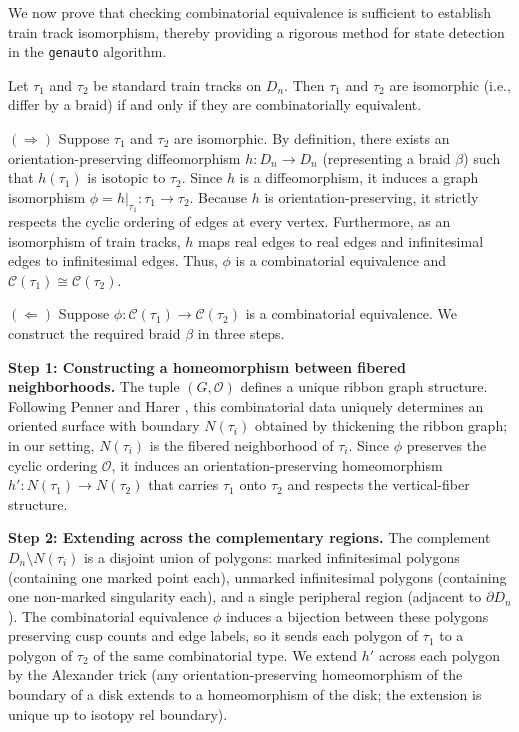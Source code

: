 We now prove that checking combinatorial equivalence is sufficient to establish train track isomorphism, thereby providing a rigorous method for state detection in the \texttt{genauto} algorithm.

\begin{prop}
    \label{prop:comb_iso}
    Let $\tau_1$ and $\tau_2$ be standard train tracks on $D_n$. Then $\tau_1$ and $\tau_2$ are isomorphic (i.e., differ by a braid) if and only if they are combinatorially equivalent.
\end{prop}

\begin{myproof}
    $(\Rightarrow)$ Suppose $\tau_1$ and $\tau_2$ are isomorphic. By definition, there exists an orientation-preserving diffeomorphism $h: D_n \to D_n$ (representing a braid $\beta$) such that $h(\tau_1)$ is isotopic to $\tau_2$. Since $h$ is a diffeomorphism, it induces a graph isomorphism $\phi = h|_{\tau_1}: \tau_1 \to \tau_2$. Because $h$ is orientation-preserving, it strictly respects the cyclic ordering of edges at every vertex. Furthermore, as an isomorphism of train tracks, $h$ maps real edges to real edges and infinitesimal edges to infinitesimal edges. Thus, $\phi$ is a combinatorial equivalence and $\mathcal{C}(\tau_1) \cong \mathcal{C}(\tau_2)$.

    $(\Leftarrow)$ Suppose $\phi: \mathcal{C}(\tau_1) \to \mathcal{C}(\tau_2)$ is a combinatorial equivalence. We construct the required braid $\beta$ in three steps.

    \textbf{Step 1: Constructing a homeomorphism between fibered neighborhoods.}
    The tuple $(G, \mathcal{O})$ defines a unique ribbon graph structure. Following Penner and Harer \cite[Section 1.1]{penner1992combinatorics}, this combinatorial data uniquely determines an oriented surface with boundary $N(\tau_i)$ obtained by thickening the ribbon graph; in our setting, $N(\tau_i)$ is the fibered neighborhood of $\tau_i$. Since $\phi$ preserves the cyclic ordering $\mathcal{O}$, it induces an orientation-preserving homeomorphism $h': N(\tau_1) \to N(\tau_2)$ that carries $\tau_1$ onto $\tau_2$ and respects the vertical-fiber structure.

    \textbf{Step 2: Extending across the complementary regions.}
    The complement $D_n \setminus N(\tau_i)$ is a disjoint union of polygons: marked infinitesimal polygons (containing one marked point each), unmarked infinitesimal polygons (containing one non-marked singularity each), and a single peripheral region (adjacent to $\partial D_n$). The combinatorial equivalence $\phi$ induces a bijection between these polygons preserving cusp counts and edge labels, so it sends each polygon of $\tau_1$ to a polygon of $\tau_2$ of the same combinatorial type. We extend $h'$ across each polygon by the Alexander trick (any orientation-preserving homeomorphism of the boundary of a disk extends to a homeomorphism of the disk; the extension is unique up to isotopy rel boundary).


\end{myproof}
